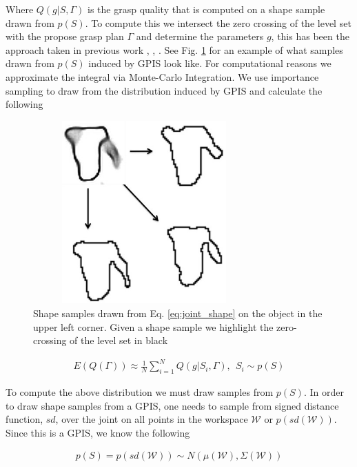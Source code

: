 \documentclass[letterpaper, 10 pt, conference]{ieeeconf}  %
\begin{document}
Where $Q(g|S,\Gamma)$ is the grasp quality that is computed on a shape sample drawn from $p(S)$. To compute this we intersect the zero crossing of the level set with the propose grasp plan $\Gamma$ and determine the parameters $g$, this has been the approach taken in previous work  \cite{kehoe2012estimating}, \cite{kehoe2012toward},  \cite{christopoulos2007handling}. See Fig. \ref{fig:shape_samples} for an example of what samples drawn from $p(S)$ induced by GPIS look like. For computational reasons we approximate the integral via Monte-Carlo Integration. We use importance sampling to draw from the distribution induced by GPIS and calculate the following

\begin{figure}[ht!]
\centering
\includegraphics[width = 8.5cm, height= 7cm ]{figures/Slide13.jpg}
\caption{Shape samples drawn from Eq. \ref{eq:joint_shape} on the object in the upper left corner. Given a shape sample we highlight the zero-crossing of the level set in black}
\vspace*{-10pt}
\label{fig:shape_samples}
\end{figure}

\begin{align*}
E(Q(\Gamma)) \approx \frac{1}{N} \sum_{i=1}^N Q(g|S_i,\Gamma) , \ \  S_i \sim p(S)
\end{align*}

To compute the above distribution we must draw samples from $p(S)$. In order to draw shape samples from a GPIS, one needs to sample from signed distance function, $sd$, over the joint on all points in the workspace $\mathcal{W}$ or $p(sd(\mathcal{W}))$. Since this is a GPIS, we know the following 

\begin{align}\label{eq:joint_shape}
p(S) = p(sd(\mathcal{W})) \sim N(\mu(\mathcal{W}),\Sigma(\mathcal{W}))
\end{align}
\end{document}
